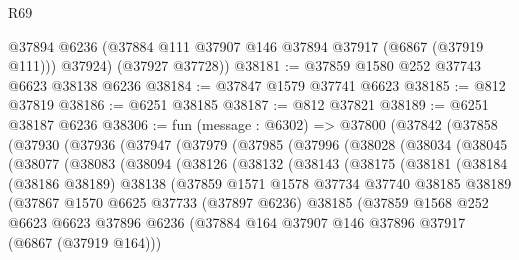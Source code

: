 \begin{lexlean}{R69}
\begin{coremodule}
{        @37894
        @6236
        (@37884 @111 @37907 @146 @37894 @37917 (@6867 (@37919 @111)))
        @37924)
      (@37927 @37728))
@38181 := @37859 @1580 @252 @37743 @6623 @38138 @6236
@38184 := @37847 @1579 @37741 @6623
@38185 := @812 @37819
@38186 := @6251 @38185
@38187 := @812 @37821
@38189 := @6251 @38187 @6236
@38306 := fun (message : @6302) =>
  @37800
    (@37842
      (@37858
        (@37930
          (@37936
            (@37947
              (@37979
                (@37985
                  (@37996
                    (@38028
                      (@38034
                        (@38045
                          (@38077
                            (@38083
                              (@38094
                                (@38126
                                  (@38132
                                    (@38143
                                      (@38175
                                        (@38181
                                          (@38184
                                            (@38186 @38189)
                                            @38138
                                            (@37859
                                              @1571
                                              @1578
                                              @37734
                                              @37740
                                              @38185
                                              @38189
                                              (@37867
                                                @1570
                                                @6625
                                                @37733
                                                (@37897 @6236)
                                                @38185
                                                (@37859
                                                  @1568
                                                  @252
                                                  @6623
                                                  @6623
                                                  @37896
                                                  @6236
                                                  (@37884
                                                    @164
                                                    @37907
                                                    @146
                                                    @37896
                                                    @37917
                                                    (@6867 (@37919 @164)))
}
\end{coremodule}
\end{lexlean}
